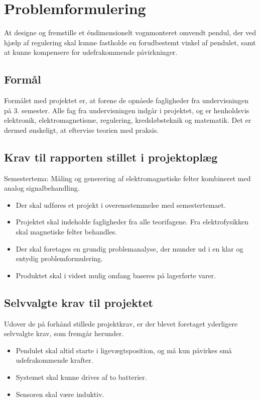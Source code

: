 
\section{Problemformulering}
At designe og fremstille et éndimensionelt vognmonteret omvendt pendul, der ved hjælp af regulering skal kunne fastholde en forudbestemt vinkel af pendulet, samt at kunne kompensere for udefrakommende påvirkninger. 

\subsection{Formål}
Formålet med projektet er, at forene de opnåede fagligheder fra undervisningen på 3. semester. 
Alle fag fra undervisningen indgår i projektet, og er henholdsvis elektronik, elektromagnetisme, regulering, kredsløbsteknik og matematik.
Det er dermed ønskeligt, at eftervise teorien med praksis. 


\subsection{Krav til rapporten stillet i projektoplæg}
Semestertema: Måling og generering af elektromagnetiske felter kombineret med analog signalbehandling.
\begin{itemize}
\item Der skal udføres et projekt i overensstemmelse med semestertemaet.
\item Projektet skal indeholde fagligheder fra alle teorifagene. Fra elektrofysikken skal
magnetiske felter behandles.
\item Der skal foretages en grundig problemanalyse, der munder ud i en klar og entydig
problemformulering.
\item Produktet skal i videst mulig omfang baseres på lagerførte varer.
\end{itemize}

\subsection{Selvvalgte krav til projektet} \label{afs:kravspecifikation}
Udover de på forhånd stillede projektkrav, er der blevet foretaget yderligere selvvalgte krav, som fremgår herunder.
\begin{itemize}
\item Pendulet skal altid starte i ligevægtsposition, og må kun påvirkes små udefrakommende krafter.
\item Systemet skal kunne drives af to batterier.
\item Sensoren skal være induktiv.
\end{itemize}

